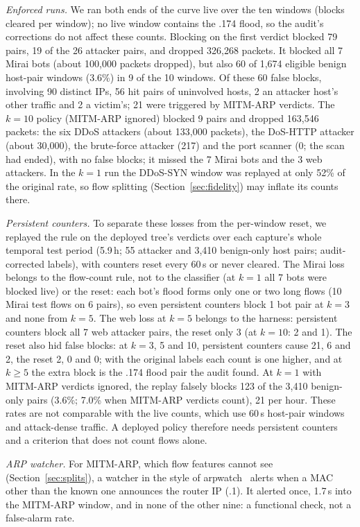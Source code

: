 \emph{Enforced runs.} We ran both ends of the curve live over the ten windows (blocks cleared per window); no live window contains the .174 flood, so the audit's corrections do not affect these counts. Blocking on the first verdict blocked 79 pairs, 19 of the 26 attacker pairs, and dropped 326,268 packets. It blocked all 7 Mirai bots (about 100,000 packets dropped), but also 60 of 1,674 eligible benign host-pair windows (3.6\%) in 9 of the 10 windows. Of these 60 false blocks, involving 90 distinct IPs, 56 hit pairs of uninvolved hosts, 2 an attacker host's other traffic and 2 a victim's; 21 were triggered by MITM-ARP verdicts. The $k=10$ policy (MITM-ARP ignored) blocked 9 pairs and dropped 163,546 packets: the six DDoS attackers (about 133,000 packets), the DoS-HTTP attacker (about 30,000), the brute-force attacker (217) and the port scanner (0; the scan had ended), with no false blocks; it missed the 7 Mirai bots and the 3 web attackers. In the $k=1$ run the DDoS-SYN window was replayed at only 52\% of the original rate, so flow splitting (Section~\ref{sec:fidelity}) may inflate its counts there.

\emph{Persistent counters.} To separate these losses from the per-window reset, we replayed the rule on the deployed tree's verdicts over each capture's whole temporal test period (5.9\,h; 55 attacker and 3,410 benign-only host pairs; audit-corrected labels), with counters reset every 60\,s or never cleared. The Mirai loss belongs to the flow-count rule, not to the classifier (at $k=1$ all 7 bots were blocked live) or the reset: each bot's flood forms only one or two long flows (10 Mirai test flows on 6 pairs), so even persistent counters block 1 bot pair at $k=3$ and none from $k=5$. The web loss at $k=5$ belongs to the harness: persistent counters block all 7 web attacker pairs, the reset only 3 (at $k=10$: 2 and 1). The reset also hid false blocks: at $k=3$, 5 and 10, persistent counters cause 21, 6 and 2, the reset 2, 0 and 0; with the original labels each count is one higher, and at $k\ge5$ the extra block is the .174 flood pair the audit found. At $k=1$ with MITM-ARP verdicts ignored, the replay falsely blocks 123 of the 3,410 benign-only pairs (3.6\%; 7.0\% when MITM-ARP verdicts count), 21 per hour. These rates are not comparable with the live counts, which use 60\,s host-pair windows and attack-dense traffic. A deployed policy therefore needs persistent counters and a criterion that does not count flows alone.

\emph{ARP watcher.} For MITM-ARP, which flow features cannot see (Section~\ref{sec:splits}), a watcher in the style of arpwatch~\cite{arpwatch} alerts when a MAC other than the known one announces the router IP (.1). It alerted once, 1.7\,s into the MITM-ARP window, and in none of the other nine: a functional check, not a false-alarm rate.

